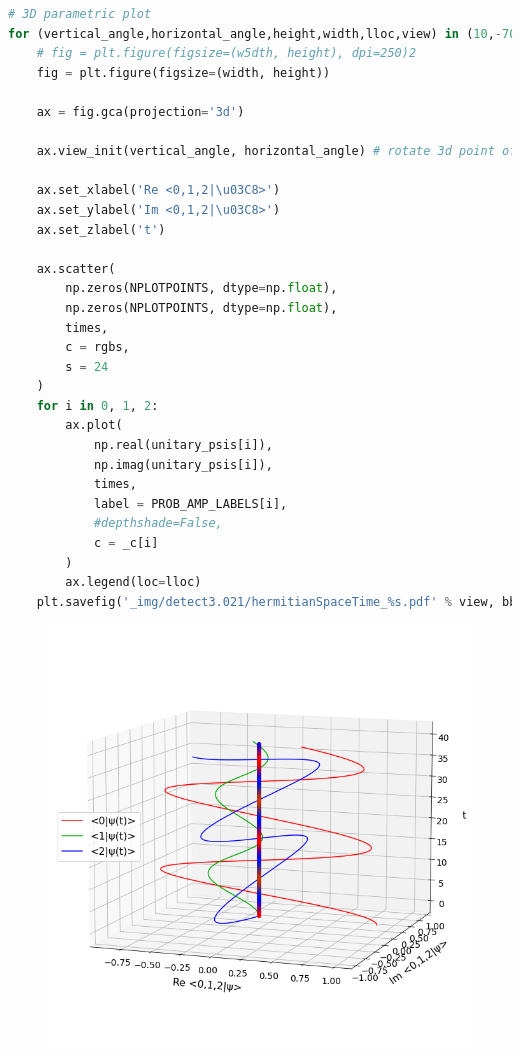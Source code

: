 \begin{lstlisting}[language=Python]
# 3D parametric plot
for (vertical_angle,horizontal_angle,height,width,lloc,view) in (10,-70,12,12,'center left','side'), (80,-120,12,12,'right','top'):
    # fig = plt.figure(figsize=(w5dth, height), dpi=250)2
    fig = plt.figure(figsize=(width, height))

    ax = fig.gca(projection='3d')

    ax.view_init(vertical_angle, horizontal_angle) # rotate 3d point of view

    ax.set_xlabel('Re <0,1,2|\u03C8>')
    ax.set_ylabel('Im <0,1,2|\u03C8>')
    ax.set_zlabel('t')
    
    ax.scatter(
        np.zeros(NPLOTPOINTS, dtype=np.float),
        np.zeros(NPLOTPOINTS, dtype=np.float),
        times,
        c = rgbs,
        s = 24
    )
    for i in 0, 1, 2:
        ax.plot(
            np.real(unitary_psis[i]),
            np.imag(unitary_psis[i]),
            times,
            label = PROB_AMP_LABELS[i],
            #depthshade=False,
            c = _c[i]
        )
        ax.legend(loc=lloc)
    plt.savefig('_img/detect3.021/hermitianSpaceTime_%s.pdf' % view, bbox_inches=0, pad_inches=0)
\end{lstlisting}

\begin{figure}[h!]
\centering
\includegraphics[width=0.66\linewidth]{tex/appendix/nb/jupyter/3lev/output_25_0.png}

\end{figure}

